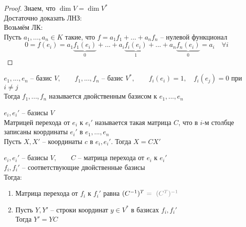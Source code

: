 \begin{proof}
	Знаем, что $ \dim V = \dim V^* $ \\
	Достаточно доказать ЛНЗ: \\
	Возьмём ЛК: \\
	Пусть $ a_1, ..., a_n \in K $ такие, что $ f = a_1f_1 + ... + a_nf_n $ -- нулевой функционал
	$$ 0 = f(e_i) = a_1\underbrace{f_1(e_i)}_0 + ... + a_i\underbrace{f_i(e_i)}_1 + ... + a_n\underbrace{f_n(e_i)}_0 = a_i \quad \forall i $$
\end{proof}

\begin{definition}
	$ e_1, ..., e_n $ -- базис $ V, \qquad f_1, ..., f_n $ -- базис $ V^*, \qquad f_i(e_i) = 1, \quad f_i(e_j) = 0 $ при $ i \ne j $ \\
	Тогда $ f_1, ..., f_n $ называется двойственным базисом к $ e_1, ..., e_n $
\end{definition}

\begin{remind}
	$ e_i, e_i' $ -- базисы $ V $ \\
	Матрицей перехода от $ e_i $ к $ e_i' $ называется такая матрица $ C $, что в $ i $-м столбце записаны координаты $ e_i' $ в $ e_1, ..., e_n $ \\
	Пусть $ X, X' $ -- координаты $ c $ в $ e_i, e_i' $. Тогда $ X = CX' $
\end{remind}

\begin{theorem}
	$ e_i, e_i' $ -- базисы $ V, \qquad C $ -- матрица перехода от $ e_i $ к $ e_i' $ \\
	$ f_i, f_i' $ -- соответствующие двойственные базисы \\
	Тогда:
	\begin{enumerate}
		\item Матрица перехода от $ f_i $ к $ f_i' $ равна $ (C^{-1})^T \nimp[~ = ~ (C^T)^{-1}] $

		\item Пусть $ Y, Y' $ -- строки координат $ y \in V^* $ в базисах $ f_i, f_i' $ \\
		Тогда $ Y' = YC $
	\end{enumerate}
\end{theorem}


